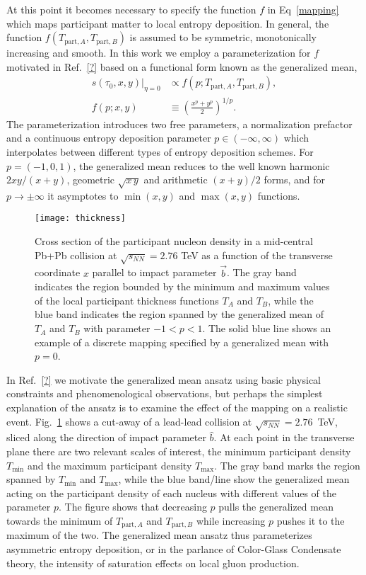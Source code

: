 \documentclass[aps,prc,reprint,amsmath,nofootinbib]{revtex4-1}
\newcommand{\sqrts}{\sqrt{s_{NN}}}
\newcommand{\TA}{T_{\text{part},A}}
\newcommand{\TB}{T_{\text{part},B}}
\begin{document}
At this point it becomes necessary to specify the function $f$ in Eq~\eqref{mapping} which maps participant matter to local entropy deposition. In general, the function $f(\TA, \TB)$ is assumed to be symmetric, monotonically increasing and smooth. In this work we employ a parameterization for $f$ motivated in Ref.~\ref{?} based on a functional form known as the generalized mean,
\begin{align}
    \label{entropy_propto}
    s(\tau_0, x, y)\vert_{\eta=0} &\propto f(p; \TA, \TB), \\
    f(p; x, y) &\equiv \left( \frac{x^p + y^p}{2} \right)^{1/p}.
\end{align}
The parameterization introduces two free parameters, a normalization prefactor and a continuous entropy deposition parameter $p\in(-\infty, \infty)$ which interpolates between different types of entropy deposition schemes. For ${p=(-1, 0, 1)}$, the generalized mean reduces to the well known harmonic $2 x y/(x + y)$, geometric $\sqrt{x\,y}$ and arithmetic $(x + y)/2$ forms, and for $p\rightarrow \pm\infty$ it asymptotes to $\min(x,y)$ and $\max(x,y)$ functions.

\begin{figure}[t]
    \texttt{[image: thickness]}
    \caption{Cross section of the participant nucleon density in a mid-central Pb+Pb collision at $\sqrts=2.76$ TeV as a function of the transverse coordinate $x$ parallel to impact parameter $\vec{b}$. The gray band indicates the region bounded by the minimum and maximum values of the local participant thickness functions $T_A$ and $T_B$, while the blue band indicates the region spanned by the generalized mean of $T_A$ and $T_B$ with parameter $-1<p<1$. The solid blue line shows an example of a discrete mapping specified by a generalized mean with $p=0$.} 
    \label{fig:thickness}
\end{figure}

In Ref.~\ref{?} we motivate the generalized mean ansatz using basic physical constraints and phenomenological observations, but perhaps the simplest explanation of the ansatz is to examine the effect of the mapping on a realistic event. Fig.~\ref{fig:thickness} shows a cut-away of a lead-lead collision at $\sqrts=2.76$~TeV, sliced along the direction of impact parameter $\hat{b}$. At each point in the transverse plane there are two relevant scales of interest, the minimum participant density $T_\text{min}$ and the maximum participant density $T_\text{max}$. The gray band marks the region spanned by $T_\text{min}$ and $T_\text{max}$, while the blue band/line show the generalized mean acting on the participant density of each nucleus with different values of the parameter $p$. The figure shows that decreasing $p$ pulls the generalized mean towards the minimum of $\TA$ and $\TB$ while increasing $p$ pushes it to the maximum of the two. The generalized mean ansatz thus parameterizes asymmetric entropy deposition, or in the parlance of Color-Glass Condensate theory, the intensity of saturation effects on local gluon production.
\end{document}
